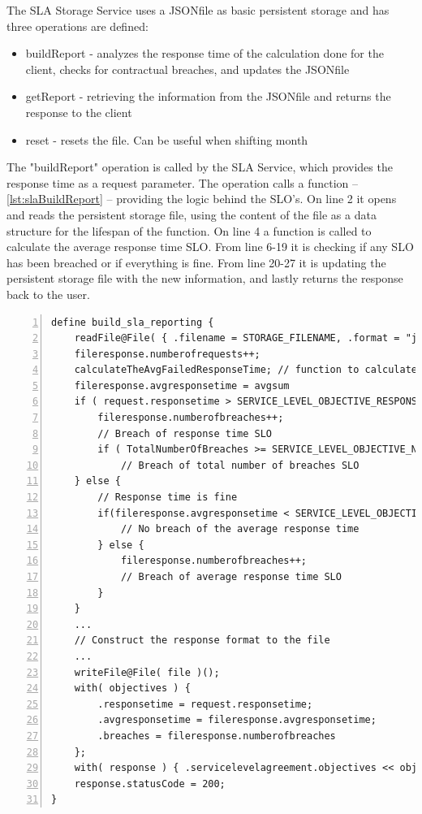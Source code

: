 \documentclass[12pt]{article}
\begin{document}
The SLA Storage Service uses a JSON\-file as basic persistent storage and has three operations are defined:
\begin{itemize}
    \item buildReport - analyzes the response time of the calculation done for the client, checks for contractual breaches, and updates the JSON\-file
    \item getReport - retrieving the information from the JSON\-file and returns the response to the client
    \item reset - resets the file. Can be useful when shifting month
\end{itemize}

The "buildReport" operation is called by the SLA Service, which provides the response time as a request parameter. The operation calls a function -- \ref{lst:slaBuildReport} -- providing the logic behind the SLO's. On line 2 it opens and reads the persistent storage file, using the content of the file as a data structure for the lifespan of the function. On line 4 a function is called to calculate the average response time SLO. From line 6-19 it is checking if any SLO has been breached or if everything is fine. From line 20-27 it is updating the persistent storage file with the new information, and lastly returns the response back to the user. 

\begin{lstlisting}[caption=Updates persistent storage file and checks for contractual breaches, captionpos=b, label=slaBuildReport, frame=single, numbers=left]
define build_sla_reporting {
    readFile@File( { .filename = STORAGE_FILENAME, .format = "json" } )( fileresponse );
    fileresponse.numberofrequests++;
    calculateTheAvgFailedResponseTime; // function to calculate the total average response time 
    fileresponse.avgresponsetime = avgsum
    if ( request.responsetime > SERVICE_LEVEL_OBJECTIVE_RESPONSE_TIME ) {
        fileresponse.numberofbreaches++;
        // Breach of response time SLO
        if ( TotalNumberOfBreaches >= SERVICE_LEVEL_OBJECTIVE_NUMBER_OF_BREACH_RESPONSE_TIMES ) 
            // Breach of total number of breaches SLO
    } else {
        // Response time is fine
        if(fileresponse.avgresponsetime < SERVICE_LEVEL_OBJECTIVE_AVG_RESPONSE_TIME) {
            // No breach of the average response time
        } else {
            fileresponse.numberofbreaches++;
            // Breach of average response time SLO
        }
    }
    ...
    // Construct the response format to the file
    ...
    writeFile@File( file )();
    with( objectives ) {
        .responsetime = request.responsetime;
        .avgresponsetime = fileresponse.avgresponsetime;
        .breaches = fileresponse.numberofbreaches
    };
    with( response ) { .servicelevelagreement.objectives << objectives };
    response.statusCode = 200;
}
\end{lstlisting}
\end{document}
